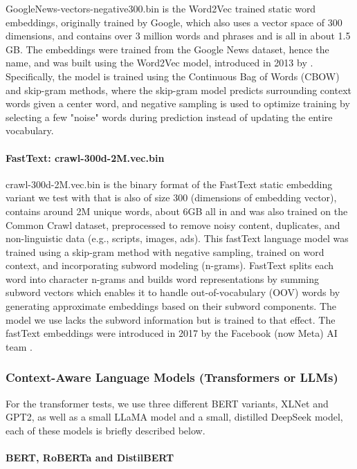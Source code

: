 \documentclass[final]{clv2025}
\begin{document}
GoogleNews-vectors-negative300.bin is the Word2Vec trained static word embeddings, originally trained by Google, which also uses a vector space of 300 dimensions, and contains over 3 million words and phrases and is all in about 1.5 GB. The embeddings were trained from the Google News dataset, hence the name, and was built using the Word2Vec model, introduced in 2013 by \cite{mikolov}. Specifically, the model is trained using the Continuous Bag of Words (CBOW) and skip-gram methods, where the skip-gram model predicts surrounding context words given a center word, and negative sampling is used to optimize training by selecting a few "noise" words during prediction instead of updating the entire vocabulary.

\paragraph{FastText: crawl-300d-2M.vec.bin}

crawl-300d-2M.vec.bin is the binary format of the FastText static embedding variant we test with that is also of size 300 (dimensions of embedding vector), contains around 2M unique words, about 6GB all in and was also trained on the Common Crawl dataset, preprocessed to remove noisy content, duplicates, and non-linguistic data (e.g., scripts, images, ads). This fastText language model was trained using a skip-gram method with negative sampling, trained on word context, and incorporating subword modeling (n-grams). FastText splits each word into character n-grams and builds word representations by summing subword vectors which enables it to handle out-of-vocabulary (OOV) words by generating approximate embeddings based on their subword components. The model we use lacks the subword information but is trained to that effect. The fastText embeddings were introduced in 2017 by the Facebook (now Meta) AI team \cite{articleboja}.

\subsubsection{Context-Aware Language Models (Transformers or LLMs)}
For the transformer tests, we use three different BERT variants, XLNet and GPT2, as well as a small LLaMA model and a small, distilled DeepSeek model, each of these models is briefly described below.

\paragraph{BERT, RoBERTa and DistilBERT} 
\end{document}
